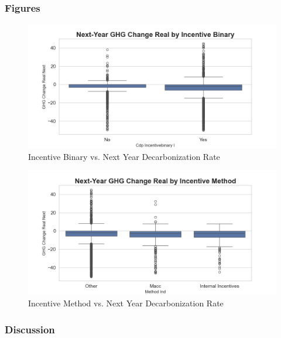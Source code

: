 

\subsubsection{Figures}
\begin{figure}[H]
\centering
    \includegraphics[width=\textwidth]{figures/ghg_change_real_next_by_cdp_incentivebinary_i.png}
\caption{Incentive Binary vs. Next Year Decarbonization Rate}
\label{fig:ghg_change_real_next_by_cdp_incentivebinary_i}
\end{figure}

\begin{figure}[H]
\centering
    \includegraphics[width=\textwidth]{figures/ghg_change_real_next_by_method_ind.png}
\caption{Incentive Method vs. Next Year Decarbonization Rate}
\label{fig:ghg_change_real_next_by_method_ind}
\end{figure}

\subsubsection{Discussion}


